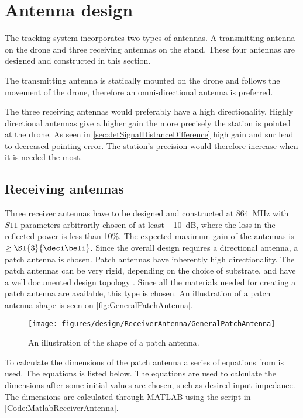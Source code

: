 \section{Antenna design}\label{sec:antenna_design}
The tracking system incorporates two types of antennas. A transmitting antenna on the drone and three receiving antennas on the stand. These four antennas are designed and constructed in this section. 

The transmitting antenna is statically mounted on the drone and follows the movement of the drone, therefore an omni-directional antenna is preferred.

The three receiving antennas would preferably have a high directionality. Highly directional antennas give a higher gain the more precisely the station is pointed at the drone. As seen in \autoref{sec:detSignalDistanceDifference} high gain and \gls{snr} lead to decreased pointing error. The station's precision would therefore increase when it is needed the most. 


\subsection{Receiving antennas}
Three receiver antennas have to be designed and constructed at \SI{864}{\mega\hertz} with $S{11}$ parameters arbitrarily chosen of at least \SI{-10}{\deci\bel}, where the loss in the reflected power is less than 10\%. The expected maximum gain of the antennas is $\geq \SI{3}{\deci\beli}$. Since the overall design requires a directional antenna, a patch antenna is chosen. Patch antennas have inherently high directionality. The patch antennas can be very rigid, depending on the choice of substrate, and have a well documented design topology \citep{AntennaTheoryBook}. Since all the materials needed for creating a patch antenna are available, this type is chosen. An illustration of a patch antenna shape is seen on \autoref{fig:GeneralPatchAntenna}. 
\begin{figure}[h]
    \centering
        \texttt{[image: figures/design/ReceiverAntenna/GeneralPatchAntenna]}
        \caption{An illustration of the shape of a patch antenna.}
        \label{fig:GeneralPatchAntenna}
\end{figure}

To calculate the dimensions of the patch antenna a series of equations from \cite{AntennaTheoryBook} is used. The equations is listed below. The equations are used to calculate the dimensions after some initial values are chosen, such as desired input impedance. The dimensions are calculated through MATLAB using the script in \autoref{Code:MatlabReceiverAntenna}.

